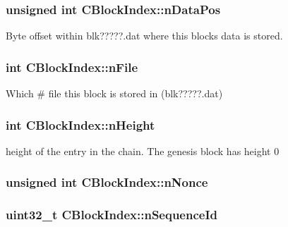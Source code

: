 \subsubsection[{n\+Data\+Pos}]{\setlength{\rightskip}{0pt plus 5cm}unsigned int C\+Block\+Index\+::n\+Data\+Pos}\label{class_c_block_index_af164283dfb2d62ac44be8d10446bce4a}


Byte offset within blk?????.dat where this block\textquotesingle{}s data is stored. 

\hypertarget{class_c_block_index_a3653cb1e1bc3fa3fcdf1ed50ff93b50a}{}
\subsubsection[{n\+File}]{\setlength{\rightskip}{0pt plus 5cm}int C\+Block\+Index\+::n\+File}\label{class_c_block_index_a3653cb1e1bc3fa3fcdf1ed50ff93b50a}


Which \# file this block is stored in (blk?????.dat) 

\hypertarget{class_c_block_index_aebfc8d6b95852546760e742553d7bfd5}{}
\subsubsection[{n\+Height}]{\setlength{\rightskip}{0pt plus 5cm}int C\+Block\+Index\+::n\+Height}\label{class_c_block_index_aebfc8d6b95852546760e742553d7bfd5}


height of the entry in the chain. The genesis block has height 0 

\hypertarget{class_c_block_index_a5e0a648ed1df8da171eba636d5ebef01}{}
\subsubsection[{n\+Nonce}]{\setlength{\rightskip}{0pt plus 5cm}unsigned int C\+Block\+Index\+::n\+Nonce}\label{class_c_block_index_a5e0a648ed1df8da171eba636d5ebef01}
\hypertarget{class_c_block_index_a4a679af5f7924cc594b8131371b21e54}{}
\subsubsection[{n\+Sequence\+Id}]{\setlength{\rightskip}{0pt plus 5cm}uint32\+\_\+t C\+Block\+Index\+::n\+Sequence\+Id}\label{class_c_block_index_a4a679af5f7924cc594b8131371b21e54}


